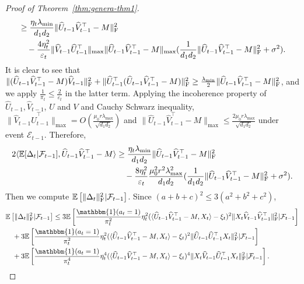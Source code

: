 \documentclass[12pt]{article}
\newcommand\fro[1]{\| #1 \|_{\rm{F}}}
\newcommand{\inp}[2]{\langle #1,#2\rangle}
\def\EE{{\mathbb E}}
\theoremstyle{plain}
\begin{document}
\begin{proof}[Proof of Theorem~\ref{thm:genera-thm1}]
\begin{align*}
        &\geq \frac{\eta_t\lambda_{\min}}{d_1d_2}\fro{\widehat{U}_{t-1}\widehat{V}_{t-1}^{\top}-M}^2\\
        &\quad - \frac{4\eta_t^2}{\varepsilon_t}\|\widehat{V}_{t-1}\widehat{U}_{t-1}^{\top}\|_{\max}\|\widehat{U}_{t-1}\widehat{V}_{t-1}^{\top}-M\|_{\max}(\frac{1}{d_1d_2}\fro{\widehat{U}_{t-1}\widehat{V}_{t-1}^{\top}-M}^2+\sigma^2).
    \end{align*}
    It is clear to see that $\fro{(\widehat{U}_{t-1}\widehat{V}_{t-1}^{\top} - M)\widehat{V}_{t-1}}^2 + \fro{\widehat{U}_{t-1}^{\top}(\widehat{U}_{t-1}\widehat{V}_{t-1}^{\top} - M)}^2\geq \frac{\lambda_{\min}}{2}\fro{\widehat{U}_{t-1}\widehat{V}_{t-1}^{\top} - M}^2$, and we apply $\frac{1}{\pi_t}\leq \frac{2}{\varepsilon_t}$ in the latter term. Applying the incoherence property of $\widehat{U}_{t-1}, \widehat{V}_{t-1}$, $U$ and $V$ and Cauchy Schwarz inequality, $\|\widehat{V}_{t-1}\widehat{U}_{t-1}^{\top}\|_{\max}=O(\frac{\mu_0r\lambda_{\max}}{\sqrt{d_1d_2}})$ and $\|\widehat{U}_{t-1}\widehat{V}_{t-1}^{\top} - M\|_{\max}\leq \frac{2\mu_0 r\lambda_{\max}}{\sqrt{d_1d_2}}$ under event $\mathcal{E}_{t-1}$. Therefore,
    \begin{align*}
        2\inp{\EE[\Delta_t|\mathcal{F}_{t-1}]}{\widehat{U}_{t-1}\widehat{V}_{t-1}^{\top}-M}&\geq \frac{\eta_t\lambda_{\min}}{d_1d_2}\fro{\widehat{U}_{t-1}\widehat{V}_{t-1}^{\top}-M}^2 \\ &\quad - \frac{8\eta_t^2}{\varepsilon_t}\frac{\mu_0^2r^2\lambda_{\max}^2}{d_1d_2}(\frac{1}{d_1d_2}\fro{\widehat{U}_{t-1}\widehat{V}_{t-1}^{\top}-M}^2+\sigma^2).
    \end{align*}
    Then we compute $\EE\left[\fro{\Delta_t}^2|\mathcal{F}_{t-1}\right]$. Since $(a+b+c)^2\leq 3(a^2+b^2+c^2)$, 
    \begin{align*}
        &\EE\left[\fro{\Delta_t}^2|\mathcal{F}_{t-1}\right]\leq 3\EE\left[\frac{\mathbbm{1}(a_t=1)}{\pi_t^2}\eta_t^2(\inp{\widehat{U}_{t-1}\widehat{V}_{t-1}^{\top}-M}{X_t}-\xi_t)^2\fro{X_t\widehat{V}_{t-1}\widehat{V}_{t-1}^{\top}}^2 |\mathcal{F}_{t-1}\right] \\ &\quad +3\EE\left[\frac{\mathbbm{1}(a_t=1)}{\pi_t^2}\eta_t^2(\inp{\widehat{U}_{t-1}\widehat{V}_{t-1}^{\top} - M}{X_t}-\xi_t)^2\fro{\widehat{U}_{t-1}\widehat{U}_{t-1}^{\top}X_t}^2 |\mathcal{F}_{t-1}\right] \\ &\quad +3\EE\left[\frac{\mathbbm{1}(a_t=1)}{\pi_t^4}\eta_t^4(\inp{\widehat{U}_{t-1}\widehat{V}_{t-1}^{\top} - M}{X_t}-\xi_t)^4\fro{X_t\widehat{V}_{t-1}\widehat{U}_{t-1}^{\top}X_t}^2 |\mathcal{F}_{t-1}\right].
    \end{align*}

\end{proof}
\end{document}
